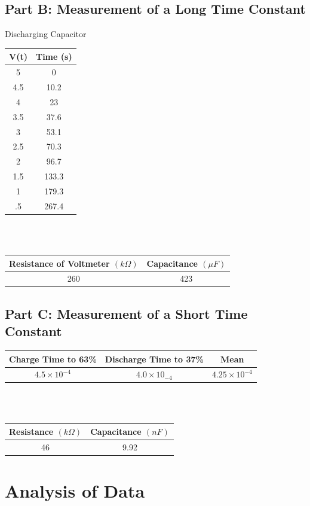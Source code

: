 \documentclass[titlepage]{article}
\begin{document}
\subsection{Part B: Measurement of a Long Time Constant}\label{sub:part_b_measurement_of_a_long_time_constant-data}
Discharging Capacitor\\
\begin{tabular}{cc}
\hline
V(t) & Time (s)\\
\hline
5 & 0\\
\hline
4.5 & 10.2\\
\hline
4 & 23\\
\hline
3.5 & 37.6\\
\hline
3 & 53.1\\
\hline
2.5 & 70.3\\
\hline
2 & 96.7\\
\hline
1.5 & 133.3\\
\hline
1 & 179.3\\
\hline
.5 & 267.4\\
\hline
\end{tabular}\\
\\
\begin{tabular}{cc}
\hline
Resistance of Voltmeter $(k\Omega)$ & Capacitance $(\mu F)$\\
\hline
260 & 423\\
\hline
\end{tabular}
\subsection{Part C: Measurement of a Short Time Constant}\label{sub:part_c_measurement_of_a_short_time_constant-data}
\begin{tabular}{ccc}
\hline
Charge Time to 63\% & Discharge Time to 37\% & Mean\\
\hline
$4.5 \times 10^{-4}$ & $4.0 \times 10_{-4}$ & $4.25 \times 10^{-4}$\\
\hline
\end{tabular}\\
\\
\begin{tabular}{cc}
\hline
Resistance $(k\Omega)$ & Capacitance $(nF)$\\
\hline
46 & 9.92\\
\hline
\end{tabular}

\section{Analysis of Data}\label{sec:analysis_of_data}
\end{document}
